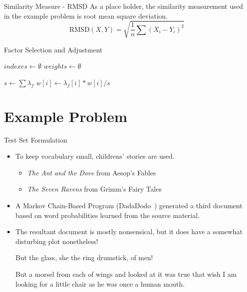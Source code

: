 \documentclass[handout]{beamer}
\begin{document}
\begin{frame}{Similarity Measure - RMSD}
    As a place holder, the similarity measurement used in the example problem is
    root mean square deviation.
    \[
        \mathrm{RMSD}(X, Y) = \displaystyle\sqrt{\frac{1}{n}\sum(X_i - Y_i)^2}
    \]
\end{frame}

\begin{frame}{Factor Selection and Adjustment}
\begin{algorithm}[H]
    $indexes \leftarrow \emptyset$\;
    $weights \leftarrow \emptyset$\;
\end{algorithm}

\begin{algorithm}[H]
    $s \leftarrow \sum \lambda_f$\;
     {
        $w[i] \leftarrow \lambda_f[i] * w[i] / s$\;
    }
\end{algorithm}

\end{frame}

\section{Example Problem}
\begin{frame}{Test Set Formulation}
    \begin{itemize}[<+->]
        \item To keep vocabulary small, childrens' stories are used.
        \begin{itemize}
            \item {\em The Ant and the Dove} from Aesop's Fables~\cite{aesop}
            \item {\em The Seven Ravens} from Grimm's Fairy Tales~\cite{grimm}
        \end{itemize}
        \item A Markov Chain-Based Program (DadaDodo~\cite{dada}) generated a third document based on word probabilities learned from the source material.
        \item The resultant document is mostly nonsensical, but it does have a somewhat disturbing plot nonetheless!
        \begin{block}{}
But the glass, she the ring drumstick, of men! 

But a morsel from each of wings and looked at it was true that wish I am
looking for a little chair as he was once a human mouth. 
        \end{block}
    \end{itemize}
\end{frame}
\end{document}
